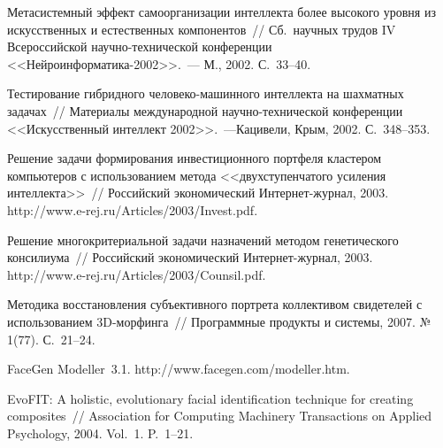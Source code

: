\begin{multicols}{2}
{{\begin{thebibliography}{99}
Метасистемный эффект самоорганизации интеллекта более высокого уровня из 
искусственных и естественных компонентов~// Сб.\ научных трудов IV Всероссийской 
на\-уч\-но-тех\-ни\-че\-ской конференции <<Нейроинформатика-2002>>.~--- М., 2002. 
С.~33--40.

Тестирование гибридного человеко-машинного интеллекта на шахматных задачах~//\linebreak 
Материалы международной научно-технической конференции <<Искусственный интеллект 
2002>>.~---\linebreak Кацивели, Крым, 2002. С.~348--353.

Решение задачи формирования инвестиционного портфеля кластером компьютеров с 
использованием метода <<двухступенчатого усиления интеллекта>>~//\linebreak
Российский 
экономический Интернет-журнал, 2003. {\sf http://www.e-rej.ru/Articles/2003/Invest.pdf}.

Решение многокритериальной задачи назначений методом генетического консилиума~// 
Российский экономический Интернет-журнал, 2003.\linebreak 
{\sf http://www.e-rej.ru/Articles/2003/Counsil.pdf}.

Методика восстановления субъективного портрета коллективом свидетелей с 
использованием 3D-мор\-фин\-га~// Программные продукты и системы, 2007.  №\,1(77). 
С.~21--24. 

FaceGen Modeller~3.1. {\sf http://www.facegen.com/\linebreak modeller.htm}.

\label{end\stat}

EvoFIT: A holistic, evolutionary facial identification technique for creating composites~// 
Association for Computing Machinery Transactions on Applied Psychology, 2004. Vol.~1. 
P.~1--21. 
 \end{thebibliography}
}
}
\end{multicols}